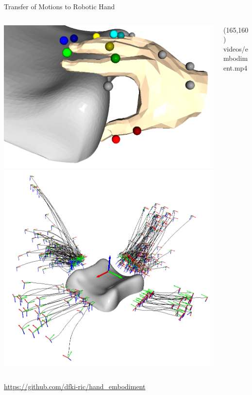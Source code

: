 \documentclass[14pt]{beamer}
\begin{document}
\begin{frame}[fragile]{Transfer of Motions to Robotic Hand}
\begin{columns}
\begin{column}{0.4\textwidth}
\includegraphics[width=\textwidth]{images/embodiment_record}
\includegraphics[width=\textwidth]{images/embodiment_dataset}
\end{column}
\begin{column}{0.6\textwidth}
\makebox(165,160){
{videos/embodiment.mp4}}%
\end{column}
\end{columns}
{\small \url{https://github.com/dfki-ric/hand_embodiment}}
\end{frame}
\end{document}
